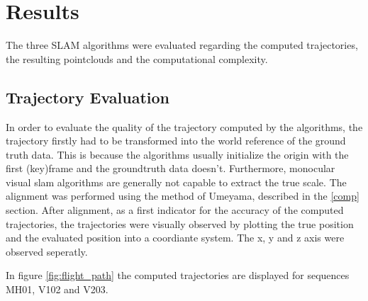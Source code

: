\chapter{Results}

The three SLAM algorithms were evaluated regarding the computed trajectories, the resulting pointclouds and
the computational complexity. 

\section{Trajectory Evaluation}

	In order to evaluate the quality of the trajectory computed by the algorithms, the trajectory firstly had to be 
	transformed into the world reference of the ground truth data. This is because the algorithms usually initialize
	the origin with the first (key)frame and the groundtruth data doesn't. Furthermore, monocular visual slam algorithms 
	are generally not capable to extract the true scale. The alignment was performed using the method of Umeyama, described
	in the \ref{comp} section. 
	After alignment, as a first indicator for the accuracy of the computed trajectories, the trajectories were visually observed by 
	plotting the true position and the evaluated position into a coordiante system. The x, y and z axis were observed seperatly. 
	
	
	In figure \ref{fig:flight_path} the computed trajectories are displayed for sequences MH01, V102 and V203. 
	

